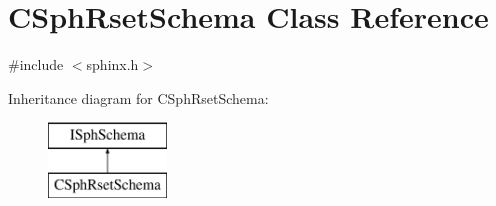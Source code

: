 \hypertarget{classCSphRsetSchema}{\section{C\-Sph\-Rset\-Schema Class Reference}
\label{classCSphRsetSchema}
}


{\ttfamily \#include $<$sphinx.\-h$>$}

Inheritance diagram for C\-Sph\-Rset\-Schema\-:\begin{figure}[H]
\begin{center}
\leavevmode
\includegraphics[height=2.000000cm]{classCSphRsetSchema}
\end{center}
\end{figure}
